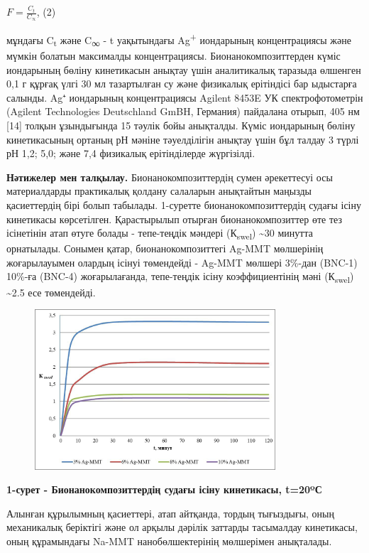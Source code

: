 \(F = \frac{C_{t}}{C_{\propto}}\), (2)

мұндағы C\textsubscript{t} және C\textsubscript{∞} - t уақытындағы
Ag\textsuperscript{+} иондарының концентрациясы және мүмкін болатын
максималды концентрациясы. Бионанокомпозиттерден күміс иондарының бөліну
кинетикасын анықтау үшін аналитикалық таразыда өлшенген 0,1 г құрғақ
үлгі 30 мл тазартылған су және физикалық ерітіндісі бар ыдыстарға
салынды. Ag⁺ иондарының концентрациясы Agilent 8453E УК
спектрофотометрін (Agilent Technologies Deutschland GmBH, Германия)
пайдалана отырып, 405 нм {[}14{]} толқын ұзындығында 15 тәулік бойы
анықталды. Күміс иондарының бөліну кинетикасының ортаның рН мәніне
тәуелділігін анықтау үшін бұл талдау 3 түрлі рН 1,2; 5,0; және 7,4
физикалық ерітінділерде жүргізілді.

{\bfseries Нәтижелер мен талқылау.} Бионанокомпозиттердің сумен әрекеттесуі
осы материалдарды практикалық қолдану салаларын анықтайтын маңызды
қасиеттердің бірі болып табылады. 1-суретте бионанокомпозиттердің судағы
ісіну кинетикасы көрсетілген. Қарастырылып отырған бионанокомпозиттер
өте тез ісінетінін атап өтуге болады - тепе-теңдік мәндері
(К\textsubscript{swel}) \textasciitilde30 минутта орнатылады. Сонымен
қатар, бионанокомпозиттегі Ag-MMT мөлшерінің жоғарылауымен олардың
ісінуі төмендейді - Ag-MMT мөлшері 3\%-дан (BNC-1) 10\%-ға (BNC-4)
жоғарылағанда, тепе-теңдік ісіну коэффициентінің мәні
(К\textsubscript{swel}) \textasciitilde2.5 есе төмендейді.

\begin{figure}[H]
	\centering
	\includegraphics[width=0.8\textwidth]{media/chem/image14}
	\caption*{}
\end{figure}


{\bfseries 1-сурет - Бионанокомпозиттердің судағы ісіну кинетикасы, t=20ºС}

Алынған құрылымның қасиеттері, атап айтқанда, тордың тығыздығы, оның
механикалық беріктігі және ол арқылы дәрілік заттарды тасымалдау
кинетикасы, оның құрамындағы Na-MMT нанобөлшектерінің мөлшерімен
анықталады.

